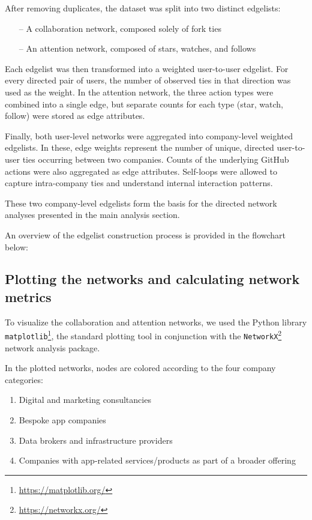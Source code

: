 After removing duplicates, the dataset was split into two distinct edgelists:

\begin{itemize}
    \item[--] A collaboration network, composed solely of fork ties
    \item[--] An attention network, composed of stars, watches, and follows
\end{itemize}

Each edgelist was then transformed into a weighted user-to-user edgelist. For every directed pair of users, the number of observed ties in that direction was used as the weight. In the attention network, the three action types were combined into a single edge, but separate counts for each type (star, watch, follow) were stored as edge attributes.

Finally, both user-level networks were aggregated into company-level weighted edgelists. In these, edge weights represent the number of unique, directed user-to-user ties occurring between two companies. Counts of the underlying GitHub actions were also aggregated as edge attributes. Self-loops were allowed to capture intra-company ties and understand internal interaction patterns.

These two company-level edgelists form the basis for the directed network analyses presented in the main analysis section.

An overview of the edgelist construction process is provided in the flowchart below:

\subsection{Plotting the networks and calculating network metrics}

To visualize the collaboration and attention networks, we used the Python library \texttt{matplotlib}\footnote{\url{https://matplotlib.org/}}, the standard plotting tool in conjunction with the \texttt{NetworkX}\footnote{\url{https://networkx.org/}} network analysis package.

In the plotted networks, nodes are colored according to the four company categories:

\begin{enumerate}
    \item Digital and marketing consultancies
    \item Bespoke app companies
    \item Data brokers and infrastructure providers
    \item Companies with app-related services/products as part of a broader offering    
\end{enumerate}

